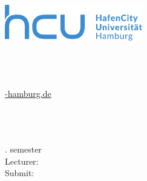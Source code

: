 \begin{titlepage}
	\thispagestyle{empty}
	
	\begin{minipage}[t]{0.4\textwidth}
		\vspace{0pt}
		\includegraphics[width=60mm]{Data/hcu_logo.pdf}
	\end{minipage}
	\hfill
	\begin{minipage}[t]{0.5\textwidth}
		\vspace{0pt}
		\begin{flushright}
			\Writer\\
			\Register\\
			\Module\\
			\href{mailto:\Mail@hcu-hamburg.de}{\Mail@hcu-hamburg.de} \\
		\end{flushright}
	\end{minipage}
	
	\vfill
	
	\begin {center}
	\Large \Type
	\end {center}
	\begin {center}
	\huge \Title
	\end {center}
	
	\vfill
	
	\begin{flushleft}
		\Event\\
		\Semester \\
		\Study\\
		\SubjectSemester. semester\\
		\vspace{10pt}
		Lecturer: \\ 
		\Lecturer
		\vspace{30pt}
		Submit: \dateofsubmission
	\end{flushleft}
	
\end{titlepage}